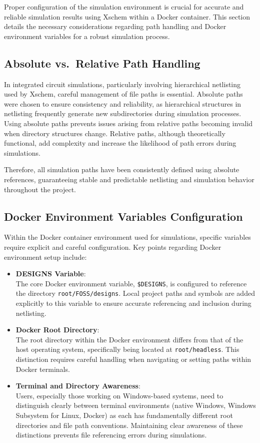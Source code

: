 \documentclass[
  letterpaper,
]{scrbook}
\begin{document}
Proper configuration of the simulation environment is crucial for
accurate and reliable simulation results using Xschem within a Docker
container. This section details the necessary considerations regarding
path handling and Docker environment variables for a robust simulation
process.

\subsection{Absolute vs.~Relative Path
Handling}\label{absolute-vs.-relative-path-handling}

In integrated circuit simulations, particularly involving hierarchical
netlisting used by Xschem, careful management of file paths is
essential. Absolute paths were chosen to ensure consistency and
reliability, as hierarchical structures in netlisting frequently
generate new subdirectories during simulation processes. Using absolute
paths prevents issues arising from relative paths becoming invalid when
directory structures change. Relative paths, although theoretically
functional, add complexity and increase the likelihood of path errors
during simulations.

Therefore, all simulation paths have been consistently defined using
absolute references, guaranteeing stable and predictable netlisting and
simulation behavior throughout the project.

\subsection{Docker Environment Variables
Configuration}\label{docker-environment-variables-configuration}

Within the Docker container environment used for simulations, specific
variables require explicit and careful configuration. Key points
regarding Docker environment setup include:

\begin{itemize}
\item
  \textbf{DESIGNS Variable}:\\
  The core Docker environment variable, \texttt{\$DESIGNS}, is
  configured to reference the directory \texttt{root/FOSS/designs}.
  Local project paths and symbols are added explicitly to this variable
  to ensure accurate referencing and inclusion during netlisting.
\item
  \textbf{Docker Root Directory}:\\
  The root directory within the Docker environment differs from that of
  the host operating system, specifically being located at
  \texttt{root/headless}. This distinction requires careful handling
  when navigating or setting paths within Docker terminals.
\item
  \textbf{Terminal and Directory Awareness}:\\
  Users, especially those working on Windows-based systems, need to
  distinguish clearly between terminal environments (native Windows,
  Windows Subsystem for Linux, Docker) as each has fundamentally
  different root directories and file path conventions. Maintaining
  clear awareness of these distinctions prevents file referencing errors
  during simulations.
\end{itemize}
\end{document}
